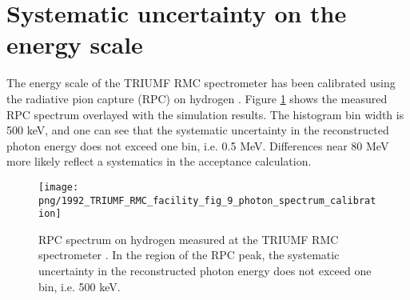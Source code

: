 \section { Systematic uncertainty on the energy scale}

The energy scale of the TRIUMF RMC spectrometer has been calibrated using the
radiative pion capture (RPC) on hydrogen \cite{RMC_1992_WRIGHT_1992_249}.
Figure \ref{fig:1992_photon_spectrum_calibration} shows the measured RPC spectrum
overlayed with the simulation results. The histogram bin width
is 500 keV, and one can see that the systematic uncertainty in the reconstructed
photon energy does not exceed one bin, i.e. 0.5 MeV. Differences near 80 MeV
more likely reflect a systematics in the acceptance calculation.

\begin{figure}[htbp]
  \begin{center}
    \texttt{[image: png/1992\_TRIUMF\_RMC\_facility\_fig\_9\_photon\_spectrum\_calibration]} 
  \end{center}
  \caption{
    RPC spectrum on hydrogen measured at the TRIUMF RMC spectrometer \cite{RMC_1992_WRIGHT_1992_249}.
    In the region of the RPC peak, the systematic uncertainty in the reconstructed photon energy does
    not exceed one bin, i.e. 500 keV.
  }
  \label{fig:1992_photon_spectrum_calibration}
\end{figure}


